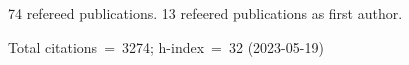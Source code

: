 74 refereed publications. 13 refeered publications as first author.

Total citations~=~3274; h-index~=~32 (2023-05-19)